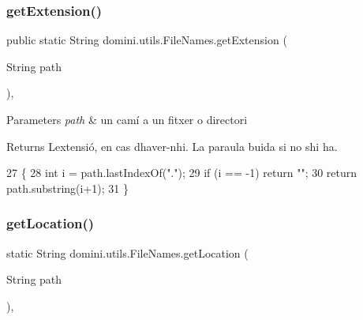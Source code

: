 \subsubsection{\texorpdfstring{get\+Extension()}{getExtension()}}
{\footnotesize\ttfamily public static String domini.\+utils.\+File\+Names.\+get\+Extension (\begin{DoxyParamCaption}\item[{String}]{path }\end{DoxyParamCaption})\hspace{0.3cm}{\ttfamily [inline]}, {\ttfamily [static]}}


\begin{DoxyParams}{Parameters}
{\em path} & un camí a un fitxer o directori \\
\hline
\end{DoxyParams}
\begin{DoxyReturn}{Returns}
L\textquotesingle{}extensió, en cas d\textquotesingle{}haver-\/n\textquotesingle{}hi. La paraula buida si no s\textquotesingle{}hi ha. 
\end{DoxyReturn}

\begin{DoxyCode}
27                                                    \{
28         \textcolor{keywordtype}{int} i = path.lastIndexOf(\textcolor{stringliteral}{"."});
29         \textcolor{keywordflow}{if} (i == -1) \textcolor{keywordflow}{return} \textcolor{stringliteral}{""};
30         \textcolor{keywordflow}{return} path.substring(i+1);
31     \}
\end{DoxyCode}
\mbox{\label{classdomini_1_1utils_1_1FileNames_afc75fde5e21552878f174ad4f28fcf21}} 
\subsubsection{\texorpdfstring{get\+Location()}{getLocation()}}
{\footnotesize\ttfamily static String domini.\+utils.\+File\+Names.\+get\+Location (\begin{DoxyParamCaption}\item[{String}]{path }\end{DoxyParamCaption})\hspace{0.3cm}{\ttfamily [inline]}, {\ttfamily [static]}}


